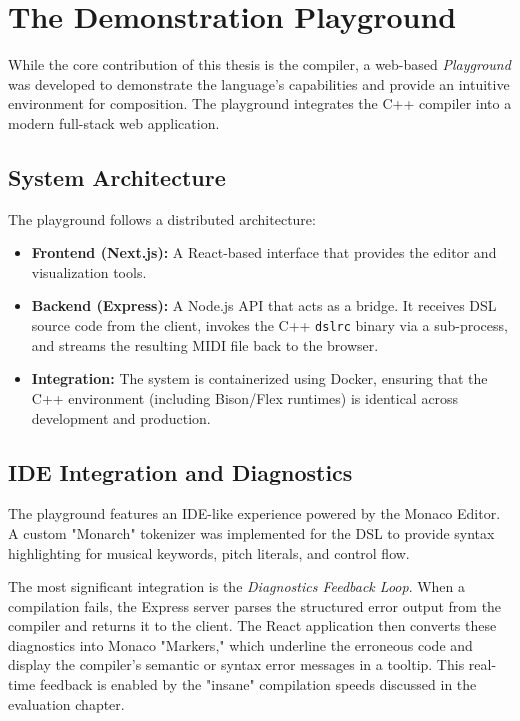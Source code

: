 \section{The Demonstration Playground}\label{sec:implementation-playground}

While the core contribution of this thesis is the compiler, a web-based \textit{Playground} was developed to
demonstrate the language's capabilities and provide an intuitive environment for composition.
The playground integrates the C++ compiler into a modern full-stack web application.

\subsection{System Architecture}

The playground follows a distributed architecture:
\begin{itemize}
  \item \textbf{Frontend (Next.js):} A React-based interface that provides the editor and visualization tools.
  \item \textbf{Backend (Express):} A Node.js API that acts as a bridge. It receives DSL source code from the
    client, invokes the C++ \texttt{dslrc} binary via a sub-process, and streams the resulting MIDI file back
    to the browser.
  \item \textbf{Integration:} The system is containerized using Docker, ensuring that the C++ environment
    (including Bison/Flex runtimes) is identical across development and production.
\end{itemize}

\subsection{IDE Integration and Diagnostics}

The playground features an IDE-like experience powered by the Monaco Editor.
A custom "Monarch" tokenizer was implemented for the DSL to provide syntax highlighting for musical keywords,
pitch literals, and control flow.

The most significant integration is the \textit{Diagnostics Feedback Loop}.
When a compilation fails, the Express server parses the structured error output from the compiler and returns
it to the client.
The React application then converts these diagnostics into Monaco "Markers," which underline the erroneous
code and display the compiler's semantic or syntax error messages in a tooltip.
This real-time feedback is enabled by the "insane" compilation speeds discussed in the evaluation chapter.

